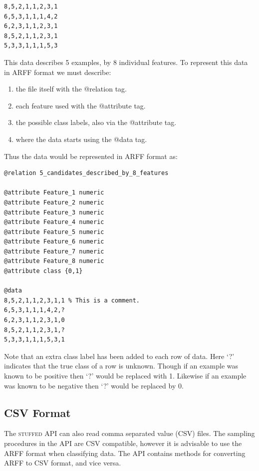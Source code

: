 \documentclass[twoside,a4paper]{refart}
\begin{document}
\begin{lstlisting}[caption={Simple data set.},label=listing_2]
8,5,2,1,1,2,3,1
6,5,3,1,1,1,4,2
6,2,3,1,1,2,3,1
8,5,2,1,1,2,3,1
5,3,3,1,1,1,5,3
\end{lstlisting}
This data describes 5 examples, by 8 individual features. To represent this data in ARFF format we must describe:
\begin{enumerate}
\item the file itself with the @relation tag.
\item each feature used with the @attribute tag. 
\item the possible class labels, also via the @attribute tag.
\item where the data starts using the @data tag.
\end{enumerate}            
Thus the data would be represented in ARFF format as:
\begin{lstlisting}[caption={Feature data output in ARFF format.}]
@relation 5_candidates_described_by_8_features

@attribute Feature_1 numeric
@attribute Feature_2 numeric
@attribute Feature_3 numeric
@attribute Feature_4 numeric
@attribute Feature_5 numeric
@attribute Feature_6 numeric
@attribute Feature_7 numeric
@attribute Feature_8 numeric
@attribute class {0,1}

@data
8,5,2,1,1,2,3,1,1 % This is a comment.
6,5,3,1,1,1,4,2,?
6,2,3,1,1,2,3,1,0
8,5,2,1,1,2,3,1,?
5,3,3,1,1,1,5,3,1
\end{lstlisting}
Note that an extra class label has been added to each row of data. Here `?' indicates that the true class of a row is unknown. Though if an example was known to be positive then `?' would be replaced with 1. Likewise if an example was known to be negative then `?' would be replaced by 0.\newpage
\subsection{CSV Format}
The \textsc{stuffed} API can also read comma separated value (CSV) files. The sampling procedures in the API are CSV compatible, however it is advisable to use the ARFF format when classifying data. The API contains methods for converting ARFF to CSV format, and vice versa.
\end{document}
